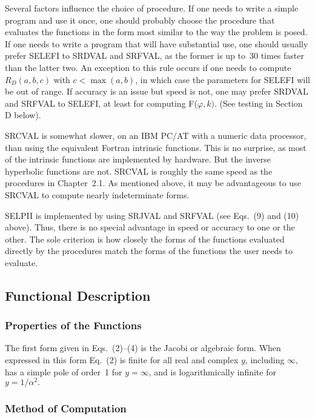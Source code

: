 \documentclass[twoside]{MATH77}
\begin{document}
Several factors influence the choice of procedure. If one
needs to write a simple program and use it once, one should probably choose
the procedure that evaluates the functions in the form most similar to the
way the problem is posed. If one needs to write a program that will have
substantial use, one should usually prefer SELEFI to SRDVAL and SRFVAL, as
the former is up to~30 times faster than the latter two. An exception to
this rule occurs if one needs to compute $R_D(a,b,c)$ with $c < \max (a,b)$,
in which case the parameters for SELEFI will be out of range. If accuracy is
an issue but speed is not, one may prefer SRDVAL and SRFVAL to SELEFI, at
least for computing F($\varphi ,k).$ (See testing in Section D below).

SRCVAL is somewhat slower, on an IBM PC/AT with a numeric data processor,
than using the equivalent Fortran intrinsic functions. This is no surprise,
as most of the intrinsic functions are implemented by hardware. But the
inverse hyperbolic functions are not. SRCVAL is roughly the same speed as
the procedures in Chapter~2.1. As mentioned above, it may be
advantageous to use SRCVAL to compute nearly indeterminate forms.

SELPII is implemented by using SRJVAL and SRFVAL (see Eqs.~(9) and
(10) above).
Thus, there is no special advantage in speed or accuracy to one or the
other. The sole criterion is how closely the forms of the functions
evaluated directly by the procedures match the forms of the functions the
user needs to evaluate.

\subsection{Functional Description}

\subsubsection{Properties of the Functions}

The first form given in Eqs.~(2)--(4) is the Jacobi or algebraic form. When
expressed in this form Eq.~(2) is finite for all real and complex $y$, including $%
\infty $, has a simple pole of order~1 for $y = \infty $, and is
logarithmically infinite for $y = 1/\alpha ^2.$

\subsubsection{Method of Computation}
\end{document}
